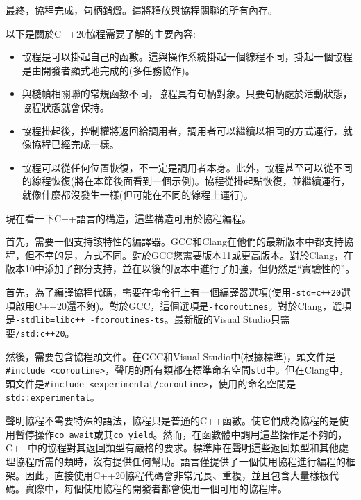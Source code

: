 最終，協程完成，句柄銷燬。這將釋放與協程關聯的所有內存。

以下是關於C++20協程需要了解的主要內容:

\begin{itemize}
\item
協程是可以掛起自己的函數。這與操作系統掛起一個線程不同，掛起一個協程是由開發者顯式地完成的(多任務協作)。

\item
與棧幀相關聯的常規函數不同，協程具有句柄對象。只要句柄處於活動狀態，協程狀態就會保持。

\item
協程掛起後，控制權將返回給調用者，調用者可以繼續以相同的方式運行，就像協程已經完成一樣。 

\item 
協程可以從任何位置恢復，不一定是調用者本身。此外，協程甚至可以從不同的線程恢復(將在本節後面看到一個示例)。協程從掛起點恢復，並繼續運行，就像什麼都沒發生一樣(但可能在不同的線程上運行)。
\end{itemize}


現在看一下C++語言的構造，這些構造可用於協程編程。 

首先，需要一個支持該特性的編譯器。GCC和Clang在他們的最新版本中都支持協程，但不幸的是，方式不同。對於GCC您需要版本11或更高版本。對於Clang，在版本10中添加了部分支持，並在以後的版本中進行了加強，但仍然是“實驗性的”。

首先，為了編譯協程代碼，需要在命令行上有一個編譯器選項(使用\texttt{-std=c++20}選項啟用C++20還不夠)。對於GCC，這個選項是\texttt{-fcoroutines}。對於Clang，選項是\texttt{-stdlib=libc++ -fcoroutines-ts}。最新版的Visual Studio只需要\texttt{/std:c++20}。

然後，需要包含協程頭文件。在GCC和Visual Studio中(根據標準)，頭文件是\texttt{\#include <coroutine>}，聲明的所有類都在標準命名空間\texttt{std}中。但在Clang中，頭文件是\texttt{\#include <experimental/coroutine>}，使用的命名空間是\texttt{std::experimental}。

聲明協程不需要特殊的語法，協程只是普通的C++函數。使它們成為協程的是使用暫停操作\texttt{co\_await}或其\texttt{co\_yield}。然而，在函數體中調用這些操作是不夠的，C++中的協程對其返回類型有嚴格的要求。標準庫在聲明這些返回類型和其他處理協程所需的類時，沒有提供任何幫助。語言僅提供了一個使用協程進行編程的框架。因此，直接使用C++20協程代碼會非常冗長、重複，並且包含大量樣板代碼。實際中，每個使用協程的開發者都會使用一個可用的協程庫。 

